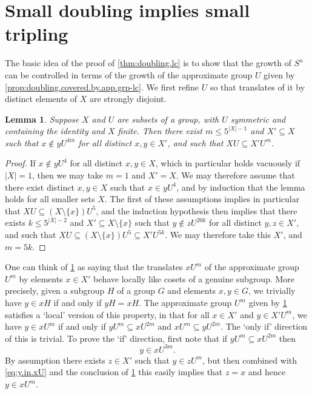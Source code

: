 \documentclass[10pt]{article}
\newtheorem{lemma}[lemma]{Lemma}
\begin{document}
\section{Small doubling implies small tripling}
The basic idea of the proof of \cref{thm:doubling.lc} is to show that the growth of $S^n$ can be controlled in terms of the growth of the approximate group $U$ given by \cref{prop:doubling.covered.by.app.grp-lc}. We first refine $U$ so that translates of it by distinct elements of $X$ are strongly disjoint.
\begin{lemma}\label{eq:xU.disjoint}
Suppose $X$ and $U$ are subsets of a group, with $U$ symmetric and containing the identity and $X$ finite. Then there exist $m\le5^{|X|-1}$ and $X'\subseteq X$ such that $x\notin yU^{4m}$ for all distinct $x,y\in X'$, and such that $XU\subseteq X'U^m$.
\end{lemma}
\begin{proof}
If $x\notin yU^{4}$ for all distinct $x,y\in X$, which in particular holds vacuously if $|X|=1$, then we may take $m=1$ and $X'=X$. We may therefore assume that there exist distinct $x,y\in X$ such that $x\in yU^{4}$, and by induction that the lemma holds for all smaller sets $X$. The first of these assumptions implies in particular that $XU\subseteq(X\setminus\{x\})U^5$, and the induction hypothesis then implies that there exists $k\le5^{|X|-2}$ and $X'\subseteq X\setminus\{x\}$ such that $y\notin zU^{20k}$ for all distinct $y,z\in X'$, and such that $XU\subseteq(X\setminus\{x\})U^5\subseteq X'U^{5k}$. We may therefore take this $X'$, and $m=5k$.
\end{proof}
One can think of \cref{eq:xU.disjoint} as saying that the translates $xU^m$ of the approximate group $U^m$ by elements $x\in X'$ behave locally like cosets of a genuine subgroup. More precisely, given a subgroup $H$ of a group $G$ and elements $x,y\in G$, we trivially have $y\in xH$ if and only if $yH=xH$. The approximate group $U^m$ given by \cref{eq:xU.disjoint} satisfies a `local' version of this property, in that for all $x\in X'$ and $y\in X'U^m$, we have $y\in xU^m$ if and only if $yU^m\subseteq xU^{2m}$ and $xU^m\subseteq yU^{2m}$. The `only if' direction of this is trivial. To prove the `if' direction, first note that if $yU^m\subseteq xU^{2m}$ then
\begin{equation}\label{eq:y.in.xU}
y\in xU^{3m}.
\end{equation}
By assumption there exists $z\in X'$ such that $y\in zU^m$, but then combined with \eqref{eq:y.in.xU} and the conclusion of \cref{eq:xU.disjoint} this easily implies that $z=x$ and hence $y\in xU^m$.
\end{document}
